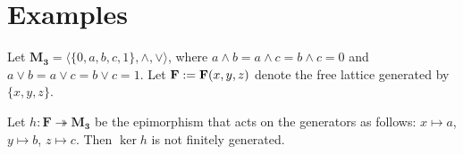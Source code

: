 \bigskip

\section{Examples}

Let $\mathbf{M_3} = \langle \{0, a, b, c, 1\}, \wedge, \vee\rangle$, where $a \wedge b = a \wedge c = b \wedge c = 0$ and $a \vee b = a \vee c = b \vee c = 1.$ Let $\mathbf{F} := \mathbf{F}(x, y, z)$ denote the free lattice generated by $\{x, y, z\}$.

\begin{proposition}
Let $h\colon \mathbf{F} \twoheadrightarrow \mathbf{M_3}$ be the epimorphism that acts on the generators as follows: $x\mapsto a$, $y\mapsto b$, $z\mapsto c.$ Then $\operatorname{ker} h$ is not finitely generated.
\end{proposition}
